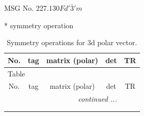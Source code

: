 \documentclass[fleqn,8pt]{jsarticle}
\begin{document}
\setcounter{MaxMatrixCols}{32}

\renewcommand{\tablename}{Table~}
\renewcommand{\figurename}{Figure~}
\begin{center}
\LARGE
MSG No. 227.130\quad$Fd'\bar{3}'m$
\end{center}
* symmetry operation
\renewcommand{\arraystretch}{1.3}
\begin{longtable}{ccccc}
\caption{Symmetry operations for 3d polar vector.}
 \\
 \hline \hline
No. & tag & matrix (polar) & det & TR \\ \hline \endfirsthead

\multicolumn{4}{l}{\tablename\ \thetable{}} \\
 \hline \hline
No. & tag & matrix (polar) & det & TR \\ \hline \endhead

 \hline \hline
\multicolumn{4}{r}{\footnotesize\it continued ...} \\ \endfoot

 \hline \hline
\multicolumn{4}{r}{} \\ \endlastfoot


\end{longtable}
\end{document}
